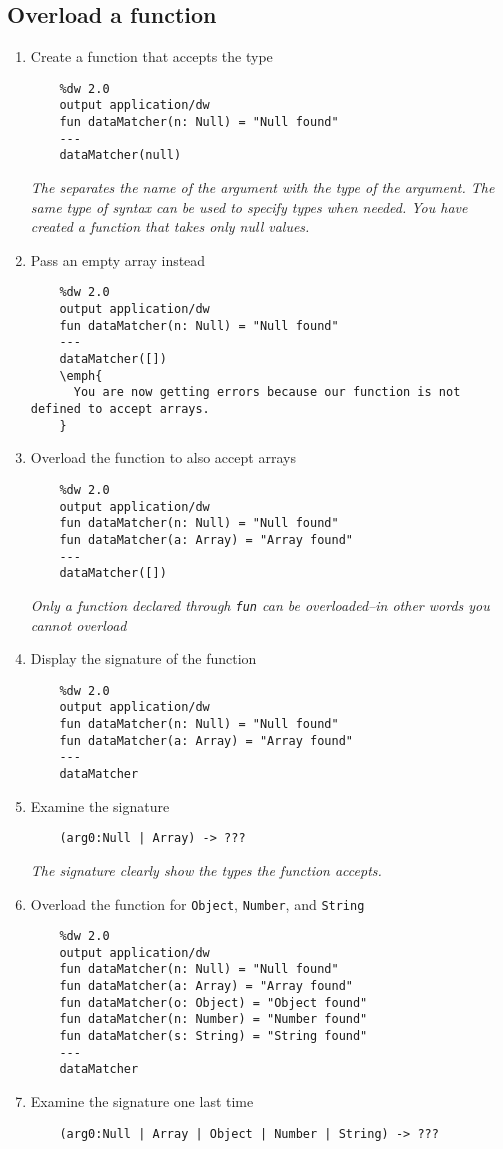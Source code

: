 \subsection{Overload a function}
\begin{enumerate}[resume*]
\item Create a function that accepts the  type
  \begin{lstlisting}
    %dw 2.0
    output application/dw
    fun dataMatcher(n: Null) = "Null found"
    ---
    dataMatcher(null)
  \end{lstlisting}
  \emph{
    The \ttt{:} separates the name of the argument with the type of the argument.  The same type of syntax can be used to specify types when needed.
    \newline
    You have created a function that takes only null values.
  }
\item Pass an empty array instead
  \begin{lstlisting}
    %dw 2.0
    output application/dw
    fun dataMatcher(n: Null) = "Null found"
    ---
    dataMatcher([])
    \emph{
      You are now getting errors because our function is not defined to accept arrays.
    }
  \end{lstlisting}
\item Overload the function to also accept arrays
  \begin{lstlisting}
    %dw 2.0
    output application/dw
    fun dataMatcher(n: Null) = "Null found"
    fun dataMatcher(a: Array) = "Array found"
    ---
    dataMatcher([])
  \end{lstlisting}
  \emph{
    Only a function declared through \lstinline{fun} can be overloaded--in other words you cannot overload \lep
  }
\item Display the signature of the  function
  \begin{lstlisting}
    %dw 2.0
    output application/dw
    fun dataMatcher(n: Null) = "Null found"
    fun dataMatcher(a: Array) = "Array found"
    ---
    dataMatcher
  \end{lstlisting}
\item Examine the signature
  \begin{lstlisting}
    (arg0:Null | Array) -> ???
  \end{lstlisting}
  \emph{
    The signature clearly show the types the function accepts.
  }
\item Overload the function for \lstinline{Object}, \lstinline{Number}, and \lstinline{String}
  \begin{lstlisting}
    %dw 2.0
    output application/dw
    fun dataMatcher(n: Null) = "Null found"
    fun dataMatcher(a: Array) = "Array found"
    fun dataMatcher(o: Object) = "Object found"
    fun dataMatcher(n: Number) = "Number found"
    fun dataMatcher(s: String) = "String found"
    ---
    dataMatcher
  \end{lstlisting}
\item Examine the signature one last time
  \begin{lstlisting}
    (arg0:Null | Array | Object | Number | String) -> ???
  \end{lstlisting}
\end{enumerate}


